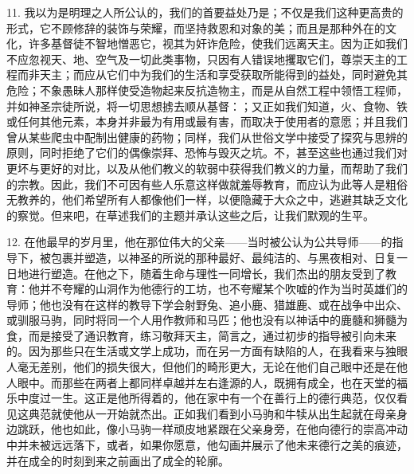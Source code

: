 11. 我以为是明理之人所公认的，我们的首要益处乃是；不仅是我们这种更高贵的形式，它不顾修辞的装饰与荣耀，而坚持救恩和对象的美；而且是那种外在的文化，许多基督徒不智地憎恶它，视其为奸诈危险，使我们远离天主。因为正如我们不应忽视天、地、空气及一切此类事物，只因有人错误地攫取它们，尊崇天主的工程而非天主；而应从它们中为我们的生活和享受获取所能得到的益处，同时避免其危险；不象愚昧人那样使受造物起来反抗造物主，而是从自然工程中领悟工程师，并如神圣宗徒所说，将一切思想掳去顺从基督：；又正如我们知道，火、食物、铁或任何其他元素，本身并非最为有用或最有害，而取决于使用者的意愿；并且我们曾从某些爬虫中配制出健康的药物；同样，我们从世俗文学中接受了探究与思辨的原则，同时拒绝了它们的偶像崇拜、恐怖与毁灭之坑。不，甚至这些也通过我们对更坏与更好的对比，以及从他们教义的软弱中获得我们教义的力量，而帮助了我们的宗教。因此，我们不可因有些人乐意这样做就羞辱教育，而应认为此等人是粗俗无教养的，他们希望所有人都像他们一样，以便隐藏于大众之中，逃避其缺乏文化的察觉。但来吧，在草述我们的主题并承认这些之后，让我们默观的生平。\par

12. 在他最早的岁月里，他在那位伟大的父亲——当时被公认为公共导师——的指导下，被包裹并塑造，以神圣的所说的那种最好、最纯洁的、与黑夜相对、日复一日地进行塑造。在他之下，随着生命与理性一同增长，我们杰出的朋友受到了教育：他并不夸耀的山洞作为他德行的工坊，也不夸耀某个吹嘘的作为当时英雄们的导师；他也没有在这样的教导下学会射野兔、追小鹿、猎雄鹿、或在战争中出众、或驯服马驹，同时将同一个人用作教师和马匹；他也没有以神话中的鹿髓和狮髓为食，而是接受了通识教育，练习敬拜天主，简言之，通过初步的指导被引向未来的。因为那些只在生活或文学上成功，而在另一方面有缺陷的人，在我看来与独眼人毫无差别，他们的损失很大，但他们的畸形更大，无论在他们自己眼中还是在他人眼中。而那些在两者上都同样卓越并左右逢源的人，既拥有成全，也在天堂的福乐中度过一生。这正是他所得着的，他在家中有一个在善行上的德行典范，仅仅看见这典范就使他从一开始就杰出。正如我们看到小马驹和牛犊从出生起就在母亲身边跳跃，他也如此，像小马驹一样顽皮地紧跟在父亲身旁，在他向德行的崇高冲动中并未被远远落下，或者，如果你愿意，他勾画并展示了他未来德行之美的痕迹，并在成全的时刻到来之前画出了成全的轮廓。\par

